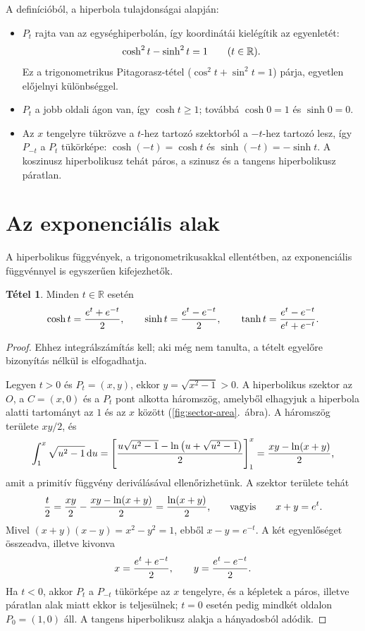 \documentclass[11pt]{scrartcl}
\theoremstyle{definition}
\newtheorem{theorem}[definition]{Tétel}
\theoremstyle{remark}
\begin{document}
A definícióból, a hiperbola tulajdonságai alapján:
\begin{itemize}
	\item $P_t$ rajta van az egységhiperbolán, így koordinátái kielégítik az
	      egyenletét:
	      \[
		      \cosh^2 t - \sinh^2 t = 1 \qquad (t \in \mathbb{R})\text.
	      \]
	      Ez a trigonometrikus Pitagorasz-tétel ($\cos^2 t + \sin^2 t = 1$)
	      párja, egyetlen előjelnyi különbséggel.
	\item $P_t$ a jobb oldali ágon van, így $\cosh t \ge 1$; továbbá
	      $\cosh 0 = 1$ és $\sinh 0 = 0$.
	\item Az $x$ tengelyre tükrözve a $t$-hez tartozó szektorból a $-t$-hez
	      tartozó lesz, így $P_{-t}$ a $P_t$ tükörképe:
	      $\cosh(-t) = \cosh t$ és $\sinh(-t) = -\sinh t$. A koszinusz
	      hiperbolikusz tehát páros, a szinusz és a tangens hiperbolikusz
	      páratlan.
\end{itemize}

\section{Az exponenciális alak}

A hiperbolikus függvények, a trigonometrikusakkal ellentétben, az
exponenciális függvénnyel is egyszerűen kifejezhetők.

\begin{theorem}
	Minden $t \in \mathbb{R}$ esetén
	\[
		\cosh t = \frac{e^t + e^{-t}}{2}, \qquad
		\sinh t = \frac{e^t - e^{-t}}{2}, \qquad
		\tanh t = \frac{e^t - e^{-t}}{e^t + e^{-t}}\text.
	\]
\end{theorem}

\begin{proof}
	Ehhez integrálszámítás kell; aki még nem tanulta, a tételt egyelőre
	bizonyítás nélkül is elfogadhatja.

	Legyen $t > 0$ és $P_t = (x, y)$, ekkor $y = \sqrt{x^2 - 1} > 0$. A
	hiperbolikus szektor az $O$, a $C = (x, 0)$ és a $P_t$ pont alkotta háromszög,
	amelyből elhagyjuk a hiperbola alatti tartományt az $1$ és az $x$ között
	(\ref{fig:sector-area}.~ábra). A háromszög területe $xy/2$, és
	\[
		\int_1^x \sqrt{u^2 - 1}\,\mathrm{d}u
		= \left[\frac{u\sqrt{u^2 - 1} - \ln\left(u + \sqrt{u^2 - 1}\right)}{2}\right]_1^x
		= \frac{xy - \ln(x + y)}{2}\text,
	\]
	amit a primitív függvény deriválásával ellenőrizhetünk. A szektor területe
	tehát
	\[
		\frac{t}{2} = \frac{xy}{2} - \frac{xy - \ln(x + y)}{2}
		= \frac{\ln(x + y)}{2}\text,
		\qquad\text{vagyis}\qquad
		x + y = e^t\text.
	\]
	Mivel $(x + y)(x - y) = x^2 - y^2 = 1$, ebből $x - y = e^{-t}$. A két
	egyenlőséget összeadva, illetve kivonva
	\[
		x = \frac{e^t + e^{-t}}{2}, \qquad y = \frac{e^t - e^{-t}}{2}\text.
	\]
	Ha $t < 0$, akkor $P_t$ a $P_{-t}$ tükörképe az $x$ tengelyre, és a
	képletek a páros, illetve páratlan alak miatt ekkor is teljesülnek; $t = 0$
	esetén pedig mindkét oldalon $P_0 = (1, 0)$ áll. A tangens hiperbolikusz
	alakja a hányadosból adódik.
\end{proof}
\end{document}
